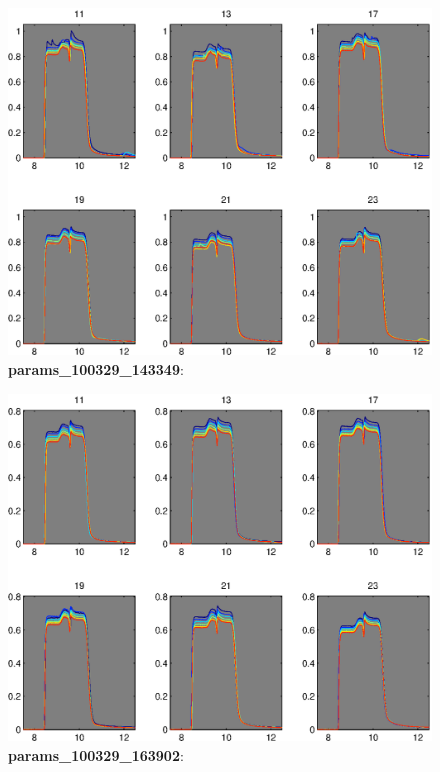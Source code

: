 \documentclass[a4paper]{report}
\begin{document}
\begin{figure}
\centering
\includegraphics[width=5in]{params_100329_143349.eps}
\caption{\textbf{params\_100329\_143349}:}
\end{figure}


\begin{figure}
\centering
\includegraphics[width=5in]{params_100329_163902.eps}
\caption{\textbf{params\_100329\_163902}:}
\end{figure}
\end{document}
